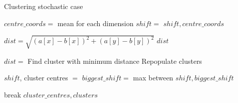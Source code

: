 \begin{algorithm}
\label{alg:KMeans}
\caption{Clustering stochastic case}
 \begin{algorithmic}[1]
    \Statex
    
    	\Statex
    		\State $centre\_coords = $ mean for each dimension
    		\State $shift = $
    		\State \Return $shift, centre\_coords$
    	\EndFunction
    
    	\Statex
    		\State $dist = \sqrt{(a[x] - b[x])^2+(a[y] - b[y])^2}$
    		\State \Return $dist$
    	\EndFunction
      
      	\Statex
      				\State $dist = $
      			\EndFor
      			\State Find cluster with minimum distance
      			\State Repopulate clusters
      		\EndFor
      		
      			\State $shift$, cluster centres $=$ 
      			\State $biggest\_shift = $ max between $shift, biggest\_shift$
      			
      		\EndFor
      			\State break
      		\EndIf
      	\EndWhile
      \State \Return $cluster\_centres, clusters$
    \EndFunction

  \end{algorithmic}
\end{algorithm}

